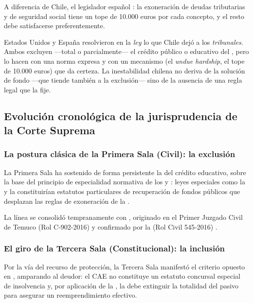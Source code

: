A diferencia de Chile, el legislador español : la exoneración de deudas tributarias y de seguridad social tiene un tope de
10.000 euros por cada concepto, y el resto debe satisfacerse preferentemente.

\begin{foco}
Estados Unidos y España resolvieron en la \emph{ley} lo que Chile dejó a los \emph{tribunales}.
Ambos excluyen ---total o parcialmente--- el crédito público o educativo del \discharge{}, pero
lo hacen con una norma expresa y con un mecanismo (el \emph{undue hardship}, el tope de
10.000 euros) que da certeza. La inestabilidad chilena no deriva de la solución de fondo
---que tiende también a la exclusión--- sino de la ausencia de una regla legal que la fije.
\end{foco}

\subsection{Evolución cronológica de la jurisprudencia de la Corte Suprema}

\subsubsection{La postura clásica de la Primera Sala (Civil): la exclusión}

La Primera Sala ha sostenido de forma persistente la  del crédito educativo,
sobre la base del principio de especialidad normativa de los  y : leyes
especiales como la \Lcae{} \citeyearpar{ley-20027} y la \Lfondosolidario{}
\citeyearpar{ley-19287} constituirían estatutos particulares de recuperación de fondos públicos
que desplazan las reglas de exoneración de la \LIR{}.

La línea se consolidó tempranamente con 
\parencite{juris-jamarne-salazar}, originado en el Primer Juzgado Civil de Temuco (Rol
C-902-2016) y confirmado por la  (Rol Civil 545-2016)
\parencite{juris-jamarne-primera-instancia}.

\subsubsection{El giro de la Tercera Sala (Constitucional): la inclusión}

Por la vía del recurso de protección, la Tercera Sala manifestó el criterio opuesto en
\parencite{juris-mancilla-tgr}, amparando al deudor: el CAE no constituye un estatuto concursal
especial de insolvencia y, por aplicación de la , la \LIR{} debe extinguir
la totalidad del pasivo para asegurar un reemprendimiento efectivo.

